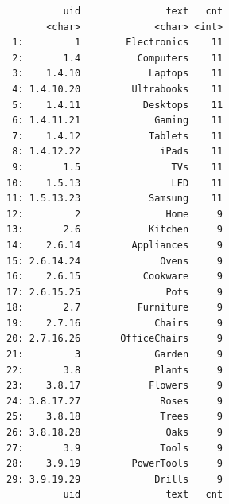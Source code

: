 \documentclass[
  american,
  10,
  a4paper,
]{book}
\theoremstyle{definition}
\theoremstyle{remark}
\begin{document}
\begin{verbatim}
          uid               text   cnt
       <char>             <char> <int>
 1:         1        Electronics    11
 2:       1.4          Computers    11
 3:    1.4.10            Laptops    11
 4: 1.4.10.20         Ultrabooks    11
 5:    1.4.11           Desktops    11
 6: 1.4.11.21             Gaming    11
 7:    1.4.12            Tablets    11
 8: 1.4.12.22              iPads    11
 9:       1.5                TVs    11
10:    1.5.13                LED    11
11: 1.5.13.23            Samsung    11
12:         2               Home     9
13:       2.6            Kitchen     9
14:    2.6.14         Appliances     9
15: 2.6.14.24              Ovens     9
16:    2.6.15           Cookware     9
17: 2.6.15.25               Pots     9
18:       2.7          Furniture     9
19:    2.7.16             Chairs     9
20: 2.7.16.26       OfficeChairs     9
21:         3             Garden     9
22:       3.8             Plants     9
23:    3.8.17            Flowers     9
24: 3.8.17.27              Roses     9
25:    3.8.18              Trees     9
26: 3.8.18.28               Oaks     9
27:       3.9              Tools     9
28:    3.9.19         PowerTools     9
29: 3.9.19.29             Drills     9
          uid               text   cnt
\end{verbatim}
\end{document}
